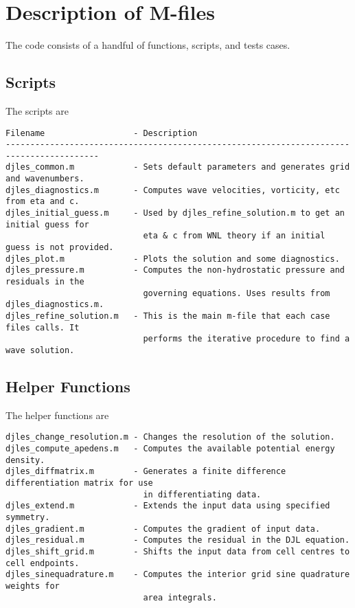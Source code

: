 \documentclass[letterpaper]{article}
\begin{document}
\section{Description of M-files}
The code consists of a handful of functions, scripts, and tests cases.

\subsection{Scripts}
The scripts are
\begin{verbatim}
Filename                  - Description
-----------------------------------------------------------------------------------------
djles_common.m            - Sets default parameters and generates grid and wavenumbers.
djles_diagnostics.m       - Computes wave velocities, vorticity, etc from eta and c.
djles_initial_guess.m     - Used by djles_refine_solution.m to get an initial guess for
                            eta & c from WNL theory if an initial guess is not provided.
djles_plot.m              - Plots the solution and some diagnostics.
djles_pressure.m          - Computes the non-hydrostatic pressure and residuals in the
                            governing equations. Uses results from djles_diagnostics.m.
djles_refine_solution.m   - This is the main m-file that each case files calls. It
                            performs the iterative procedure to find a wave solution.
\end{verbatim}

\subsection{Helper Functions}
The helper functions are
\begin{verbatim}
djles_change_resolution.m - Changes the resolution of the solution.
djles_compute_apedens.m   - Computes the available potential energy density.
djles_diffmatrix.m        - Generates a finite difference differentiation matrix for use
                            in differentiating data.
djles_extend.m            - Extends the input data using specified symmetry.
djles_gradient.m          - Computes the gradient of input data.
djles_residual.m          - Computes the residual in the DJL equation.
djles_shift_grid.m        - Shifts the input data from cell centres to cell endpoints.
djles_sinequadrature.m    - Computes the interior grid sine quadrature weights for
                            area integrals.
\end{verbatim}
\end{document}
